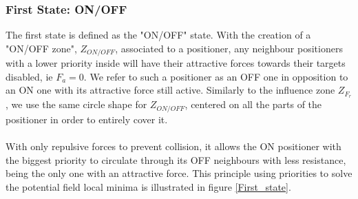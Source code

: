 \documentclass[]{spie}  %
\begin{document}
	\subsubsection{First State: ON/OFF}
	\label{first_state_chap}
	The first state  is defined as the "ON/OFF" state. With the creation of a "ON/OFF zone", $Z_{ON/OFF}$, associated to a positioner, any neighbour positioners with a lower priority inside will have their attractive forces towards their targets disabled, ie $F_a = 0$. We refer to such a positioner as an OFF one in opposition to an ON one with its attractive force still active.
	Similarly to the influence zone $Z_{F_{r}}$, we use the same circle shape for $Z_{ON/OFF}$, centered on all the parts of the positioner in order to entirely cover it.\\\\
	 With only repulsive forces to prevent collision, it allows the ON positioner with the biggest priority to circulate through its OFF neighbours with less resistance, being the only one with an attractive force. This principle using priorities to solve the potential field local minima is illustrated in figure \ref{First_state}. 	
\end{document}
